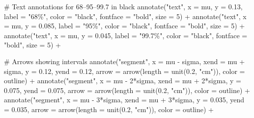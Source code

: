 \documentclass[
  letterpaper,
  DIV=11,
  numbers=noendperiod]{scrreprt}
\newenvironment{Shaded}{\begin{snugshade}}{\end{snugshade}}
\newcommand{\AttributeTok}[1]{\textcolor[rgb]{0.40,0.45,0.13}{#1}}
\newcommand{\CommentTok}[1]{\textcolor[rgb]{0.37,0.37,0.37}{#1}}
\newcommand{\DecValTok}[1]{\textcolor[rgb]{0.68,0.00,0.00}{#1}}
\newcommand{\FloatTok}[1]{\textcolor[rgb]{0.68,0.00,0.00}{#1}}
\newcommand{\FunctionTok}[1]{\textcolor[rgb]{0.28,0.35,0.67}{#1}}
\newcommand{\NormalTok}[1]{\textcolor[rgb]{0.00,0.23,0.31}{#1}}
\newcommand{\SpecialCharTok}[1]{\textcolor[rgb]{0.37,0.37,0.37}{#1}}
\newcommand{\StringTok}[1]{\textcolor[rgb]{0.13,0.47,0.30}{#1}}
\begin{document}
\begin{Shaded}
\begin{Highlighting}[]
  \CommentTok{\# Text annotations for 68–95–99.7 in black}
  \FunctionTok{annotate}\NormalTok{(}\StringTok{"text"}\NormalTok{, }\AttributeTok{x =}\NormalTok{ mu, }\AttributeTok{y =} \FloatTok{0.13}\NormalTok{, }\AttributeTok{label =} \StringTok{"68\%"}\NormalTok{, }\AttributeTok{color =} \StringTok{"black"}\NormalTok{,}
           \AttributeTok{fontface =} \StringTok{"bold"}\NormalTok{, }\AttributeTok{size =} \DecValTok{5}\NormalTok{) }\SpecialCharTok{+}
  \FunctionTok{annotate}\NormalTok{(}\StringTok{"text"}\NormalTok{, }\AttributeTok{x =}\NormalTok{ mu, }\AttributeTok{y =} \FloatTok{0.085}\NormalTok{, }\AttributeTok{label =} \StringTok{"95\%"}\NormalTok{, }\AttributeTok{color =} \StringTok{"black"}\NormalTok{,}
           \AttributeTok{fontface =} \StringTok{"bold"}\NormalTok{, }\AttributeTok{size =} \DecValTok{5}\NormalTok{) }\SpecialCharTok{+}
  \FunctionTok{annotate}\NormalTok{(}\StringTok{"text"}\NormalTok{, }\AttributeTok{x =}\NormalTok{ mu, }\AttributeTok{y =} \FloatTok{0.045}\NormalTok{, }\AttributeTok{label =} \StringTok{"99.7\%"}\NormalTok{, }\AttributeTok{color =} \StringTok{"black"}\NormalTok{,}
           \AttributeTok{fontface =} \StringTok{"bold"}\NormalTok{, }\AttributeTok{size =} \DecValTok{5}\NormalTok{) }\SpecialCharTok{+}

  \CommentTok{\# Arrows showing intervals}
  \FunctionTok{annotate}\NormalTok{(}\StringTok{"segment"}\NormalTok{, }\AttributeTok{x =}\NormalTok{ mu }\SpecialCharTok{{-}}\NormalTok{ sigma, }\AttributeTok{xend =}\NormalTok{ mu }\SpecialCharTok{+}\NormalTok{ sigma, }\AttributeTok{y =} \FloatTok{0.12}\NormalTok{, }\AttributeTok{yend =} \FloatTok{0.12}\NormalTok{,}
           \AttributeTok{arrow =} \FunctionTok{arrow}\NormalTok{(}\AttributeTok{length =} \FunctionTok{unit}\NormalTok{(}\FloatTok{0.2}\NormalTok{, }\StringTok{"cm"}\NormalTok{)), }\AttributeTok{color =}\NormalTok{ outline) }\SpecialCharTok{+}
  \FunctionTok{annotate}\NormalTok{(}\StringTok{"segment"}\NormalTok{, }\AttributeTok{x =}\NormalTok{ mu }\SpecialCharTok{{-}} \DecValTok{2}\SpecialCharTok{*}\NormalTok{sigma, }\AttributeTok{xend =}\NormalTok{ mu }\SpecialCharTok{+} \DecValTok{2}\SpecialCharTok{*}\NormalTok{sigma, }\AttributeTok{y =} \FloatTok{0.075}\NormalTok{, }\AttributeTok{yend =} \FloatTok{0.075}\NormalTok{,}
           \AttributeTok{arrow =} \FunctionTok{arrow}\NormalTok{(}\AttributeTok{length =} \FunctionTok{unit}\NormalTok{(}\FloatTok{0.2}\NormalTok{, }\StringTok{"cm"}\NormalTok{)), }\AttributeTok{color =}\NormalTok{ outline) }\SpecialCharTok{+}
  \FunctionTok{annotate}\NormalTok{(}\StringTok{"segment"}\NormalTok{, }\AttributeTok{x =}\NormalTok{ mu }\SpecialCharTok{{-}} \DecValTok{3}\SpecialCharTok{*}\NormalTok{sigma, }\AttributeTok{xend =}\NormalTok{ mu }\SpecialCharTok{+} \DecValTok{3}\SpecialCharTok{*}\NormalTok{sigma, }\AttributeTok{y =} \FloatTok{0.035}\NormalTok{, }\AttributeTok{yend =} \FloatTok{0.035}\NormalTok{,}
           \AttributeTok{arrow =} \FunctionTok{arrow}\NormalTok{(}\AttributeTok{length =} \FunctionTok{unit}\NormalTok{(}\FloatTok{0.2}\NormalTok{, }\StringTok{"cm"}\NormalTok{)), }\AttributeTok{color =}\NormalTok{ outline) }\SpecialCharTok{+}


\end{Highlighting}
\end{Shaded}
\end{document}
